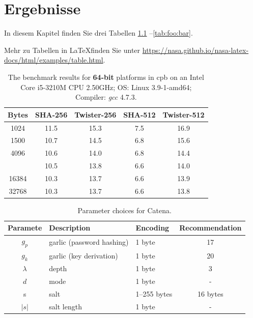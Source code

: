 \chapter{Ergebnisse}\label{chap:results}

In diesem Kapitel finden Sie drei Tabellen \ref{tab:twister:benchmarks64}
--\ref{tab:foo:bar}.

Mehr zu Tabellen in \LaTeX finden Sie unter
\url{https://nasa.github.io/nasa-latex-docs/html/examples/table.html}.

\begin{table}[ht]
\centering
\begin{tabular}{c @{\qquad} c  c @{\qquad} c  c}\toprule
\textbf{Bytes} & \textbf{SHA-256} & \textbf{Twister-256} &
\textbf{SHA-512} & \textbf{Twister-512} \\
\midrule
1024  & 11.5 & 15.3 & \phantom{0}7.5  & \phantom{0}16.9 \\
1500  & 10.7 & 14.5 & \phantom{0}6.8  & \phantom{0}15.6 \\
4096  & 10.6 & 14.0 & \phantom{0}6.8  & \phantom{0}14.4 \\
\addlinespace
10000 & 10.5 & 13.8 & \phantom{0}6.6  & \phantom{0}14.0 \\
16384 & 10.3 & 13.7 & \phantom{0}6.6  & \phantom{0}13.9 \\
32768 & 10.3 & 13.7 & \phantom{0}6.6  & \phantom{0}13.8 \\
\bottomrule
\end{tabular}
\caption[Results of the performance benchmarks for Ttwister.]{The
  benchmark results for \textbf{64-bit} platforms in \ac{cpb} on an
  Intel Core i5-3210M CPU 2.50GHz; OS: Linux 3.9-1-amd64; Compiler:
  \emph{gcc} 4.7.3.}
\label{tab:twister:benchmarks64}
\end{table}


\begin{table}[hb!]
  \centering
  \begin{tabular}{cllc}
    \textbf{Paramete } & \textbf{Description} & \textbf{Encoding} &
    \textbf{Recommendation}\\\toprule
    $g_p$ & garlic (password hashing)  & 1 byte      & 17\\
    $g_k$ & garlic (key derivation)    & 1 byte      & 20\\
    $\lambda$   & depth                      & 1 byte      & 3\\
    $d$         & mode                       & 1 byte      & -\\
    s           & salt                       & 1--255 bytes & 16 bytes\\
    $|s|$       & salt length                & 1 byte      & - \\
    \bottomrule
  \end{tabular}
  \vspace{1mm}
  \caption{Parameter choices for Catena.}
  \label{tab:catena:parameter}
\end{table}



